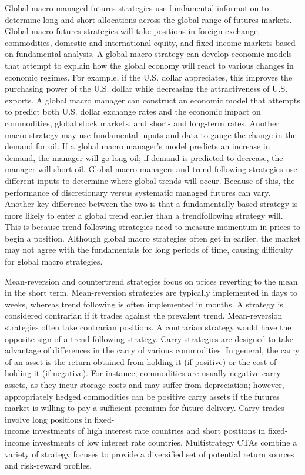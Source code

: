 \documentclass[11pt]{article}
\begin{document}
Global macro managed futures strategies use fundamental information to determine long and short allocations across the global range of futures markets. Global macro futures strategies will take positions in foreign exchange, commodities, domestic and international equity, and fixed-income markets based on fundamental analysis. A global macro strategy can develop economic models that attempt to explain how the global economy will react to various changes in economic regimes. For example, if the U.S. dollar appreciates, this improves the purchasing power of the U.S. dollar while decreasing the attractiveness of U.S. exports. A global macro manager can construct an economic model that attempts to predict both U.S. dollar exchange rates and the economic impact on commodities, global stock markets, and short- and long-term rates. Another macro strategy may use fundamental inputs and data to gauge the change in the demand for oil. If a global macro manager's model predicts an increase in demand, the manager will go long oil; if demand is predicted to decrease, the manager will short oil. Global macro managers and trend-following strategies use different inputs to determine where global trends will occur. Because of this, the performance of discretionary versus systematic managed futures can vary. Another key difference between the two is that a fundamentally based strategy is more likely to enter a global trend earlier than a trendfollowing strategy will. This is because trend-following strategies need to measure momentum in prices to begin a position. Although global macro strategies often get in earlier, the market may not agree with the fundamentals for long periods of time, causing difficulty for global macro strategies.

Mean-reversion and countertrend strategies focus on prices reverting to the mean in the short term. Mean-reversion strategies are typically implemented in days to weeks, whereas trend following is often implemented in months. A strategy is considered contrarian if it trades against the prevalent trend. Mean-reversion strategies often take contrarian positions. A contrarian strategy would have the opposite sign of a trend-following strategy. Carry strategies are designed to take advantage of differences in the carry of various commodities. In general, the carry of an asset is the return obtained from holding it (if positive) or the cost of holding it (if negative). For instance, commodities are usually negative carry assets, as they incur storage costs and may suffer from depreciation; however, appropriately hedged commodities can be positive carry assets if the futures market is willing to pay a sufficient premium for future delivery. Carry trades involve long positions in fixed-\\
income investments of high interest rate countries and short positions in fixed-income investments of low interest rate countries. Multistrategy CTAs combine a variety of strategy focuses to provide a diversified set of potential return sources and risk-reward profiles.
\end{document}
